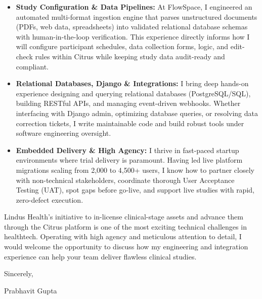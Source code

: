 \documentclass[11pt,a4paper]{article}
\begin{document}
\begin{itemize}[leftmargin=*,itemsep=3pt,topsep=3pt]
    \item \textbf{Study Configuration \& Data Pipelines:} At FlowSpace, I engineered an automated multi-format ingestion engine that parses unstructured documents (PDFs, web data, spreadsheets) into validated relational database schemas with human-in-the-loop verification. This experience directly informs how I will configure participant schedules, data collection forms, logic, and edit-check rules within Citrus while keeping study data audit-ready and compliant.
    \item \textbf{Relational Databases, Django \& Integrations:} I bring deep hands-on experience designing and querying relational databases (PostgreSQL/SQL), building RESTful APIs, and managing event-driven webhooks. Whether interfacing with Django admin, optimizing database queries, or resolving data correction tickets, I write maintainable code and build robust tools under software engineering oversight.
    \item \textbf{Embedded Delivery \& High Agency:} I thrive in fast-paced startup environments where trial delivery is paramount. Having led live platform migrations scaling from 2,000 to 4,500+ users, I know how to partner closely with non-technical stakeholders, coordinate thorough User Acceptance Testing (UAT), spot gaps before go-live, and support live studies with rapid, zero-defect execution.
\end{itemize}

\vspace{6pt}

\noindent Lindus Health's initiative to in-license clinical-stage assets and advance them through the Citrus platform is one of the most exciting technical challenges in healthtech. Operating with high agency and meticulous attention to detail, I would welcome the opportunity to discuss how my engineering and integration experience can help your team deliver flawless clinical studies.

\vspace{10pt}

\noindent Sincerely,

\vspace{8pt}

\noindent Prabhavit Gupta
\end{document}

